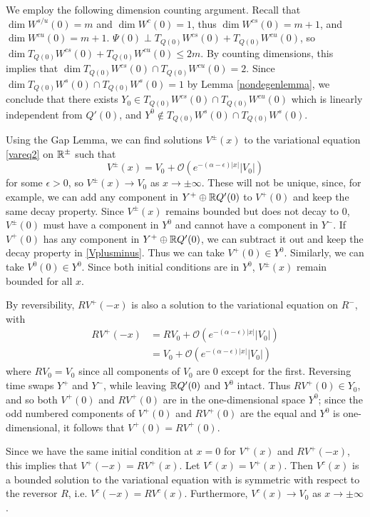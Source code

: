 \documentclass[thesis.tex]{subfiles}
\begin{document}
We employ the following dimension counting argument. Recall that $\dim W^{s/u}(0) = m$ and $\dim W^c(0) = 1$, thus $\dim W^{cs}(0) = m + 1$, and $\dim W^{cu}(0) = m + 1$. $\Psi(0) \perp T_{Q(0)}W^{cs}(0) + T_{Q(0)}W^{cu}(0)$, so $\dim T_{Q(0)}W^{cs}(0) + T_{Q(0)}W^{cu}(0) \leq 2m$. By counting dimensions, this implies that $\dim T_{Q(0)}W^{cs}(0) \cap T_{Q(0)}W^{cu}(0) = 2$. Since $\dim T_{Q(0)}W^s(0) \cap T_{Q(0)}W^s(0) = 1$ by Lemma \ref{nondegenlemma}, we conclude that there exists $Y_0 \in T_{Q(0)}W^{cs}(0) \cap T_{Q(0)}W^{cu}(0)$ which is linearly independent from $Q'(0)$, and $Y^0 \notin T_{Q(0)}W^s(0) \cap T_{Q(0)}W^s(0)$.

Using the Gap Lemma, we can find solutions $V^\pm(x)$ to the variational equation \eqref{vareq2} on $\mathbb{R}^\pm$ such that
\begin{equation}\label{Vplusminus}
V^\pm(x) = V_0 + \mathcal{O}(e^{-(\alpha - \epsilon)|x|}|V_0|)
\end{equation}
for some $\epsilon > 0$, so $V^\pm(x) \rightarrow V_0$ as $x \rightarrow \pm \infty$. These will not be unique, since, for example, we can add any component in $Y^+ \oplus \mathbb{R} Q'(0)$ to $V^+(0)$ and keep the same decay property. Since $V^\pm(x)$ remains bounded but does not decay to 0, $V^\pm(0)$ must have a component in $Y^0$ and cannot have a component in $Y^-$. If $V^+(0)$ has any component in $Y^+ \oplus \mathbb{R} Q'(0)$, we can subtract it out and keep the decay property in \eqref{Vplusminus}. Thus we can take $V^+(0) \in Y^0$. Similarly, we can take $V^0(0) \in Y^0$. Since both initial conditions are in $Y^0$, $V^\pm(x)$ remain bounded for all $x$.

By reversibility, $RV^+(-x)$ is also a solution to the variational equation on $R^-$, with 
\begin{align*}
R V^+(-x) &= R V_0 + \mathcal{O}(e^{-(\alpha - \epsilon)|x|}|V_0|) \\
&= V_0 + \mathcal{O}(e^{-(\alpha - \epsilon)|x|}|V_0|)
\end{align*}
where $R V_0 = V_0$ since all components of $V_0$ are 0 except for the first. Reversing time swaps $Y^+$ and $Y^-$, while leaving $\mathbb{R} Q'(0)$ and $Y^0$ intact. Thus $RV^+(0) \in Y_0$, and so both $V^+(0)$ and $RV^+(0)$ are in the one-dimensional space $Y^0$; since the odd numbered components of $V^+(0)$ and $RV^+(0)$ are the equal and $Y^0$ is one-dimensional, it follows that $V^+(0) = RV^+(0)$.

Since we have the same initial condition at $x = 0$ for $V^+(x)$ and $RV^+(-x)$, this implies that $V^+(-x) = RV^+(x)$. Let $V^c(x) = V^+(x)$. Then $V^c(x)$ is a bounded solution to the variational equation with is symmetric with respect to the reversor $R$, i.e. $V^c(-x) = RV^c(x)$. Furthermore, $V^c(x) \rightarrow V_0$ as $x \rightarrow \pm \infty$.
\end{document}

